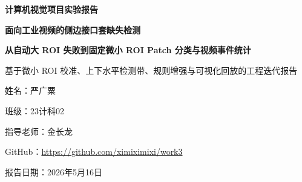 \documentclass[a4paper,12pt]{article}
\begin{document}
\begin{titlepage}
    \noindent\makebox[\linewidth]{\color{deepblue}\rule{\paperwidth}{0.2cm}}
    \vspace*{1cm}

    \begin{center}
        {\LARGE\bfseries 计算机视觉项目实验报告\par}
        \vspace{1.2cm}
        {\Huge\bfseries 面向工业视频的侧边接口套缺失检测\par}
        \vspace{0.6cm}
        {\Large\bfseries 从自动大 ROI 失败到固定微小 ROI Patch 分类与视频事件统计\par}
        \vspace{0.3cm}
        {\large 基于微小 ROI 校准、上下水平检测带、规则增强与可视化回放的工程迭代报告\par}
    \end{center}

    \vspace{2.2cm}

    \begin{flushright}
        {\large 姓名：严广粟\par}
        \vspace{0.3cm}
        {\large 班级：23计科02\par}
        \vspace{0.3cm}
        {\large 指导老师：金长龙\par}
        \vspace{0.3cm}
        {\large GitHub：\url{https://github.com/ximiximixi/work3}\par}
        \vspace{0.3cm}
        {\large 报告日期：2026年5月16日\par}
    \end{flushright}

    \vspace{2.2cm}
    \noindent\makebox[\linewidth]{\color{deepblue}\rule{\paperwidth}{0.2cm}}
\end{titlepage}

\end{document}
